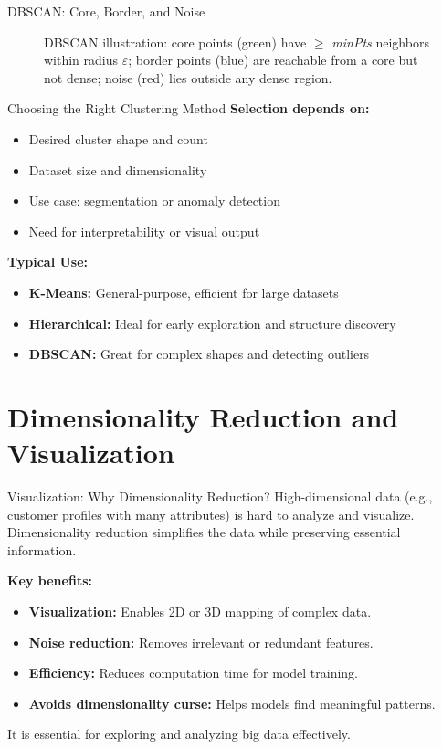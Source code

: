 \documentclass[aspectratio=169, table]{beamer}
\begin{document}
\begin{frame}{DBSCAN: Core, Border, and Noise}
\begin{figure}
		\caption{DBSCAN illustration: core points (green) have $\ge$ \textit{minPts} neighbors within radius $\varepsilon$; border points (blue) are reachable from a core but not dense; noise (red) lies outside any dense region.}
		\label{fig:dbscan-tikz}
	\end{figure}
\end{frame}


\begin{frame}{Choosing the Right Clustering Method}
	\textbf{Selection depends on:}
	\begin{itemize}
		\item Desired cluster shape and count
		\item Dataset size and dimensionality
		\item Use case: segmentation or anomaly detection
		\item Need for interpretability or visual output
	\end{itemize}
	
	\textbf{Typical Use:}
	\begin{itemize}
		\item \textbf{K-Means:} General-purpose, efficient for large datasets
		\item \textbf{Hierarchical:} Ideal for early exploration and structure discovery
		\item \textbf{DBSCAN:} Great for complex shapes and detecting outliers
	\end{itemize}
\end{frame}


\section{Dimensionality Reduction and Visualization}

\begin{frame}{Visualization: Why Dimensionality Reduction?}
	High-dimensional data (e.g., customer profiles with many attributes) is hard to analyze and visualize. Dimensionality reduction simplifies the data while preserving essential information.
	
	\textbf{Key benefits:}
	\begin{itemize}
		\item \textbf{Visualization:} Enables 2D or 3D mapping of complex data.
		\item \textbf{Noise reduction:} Removes irrelevant or redundant features.
		\item \textbf{Efficiency:} Reduces computation time for model training.
		\item \textbf{Avoids dimensionality curse:} Helps models find meaningful patterns.
	\end{itemize}
	
	It is essential for exploring and analyzing big data effectively.
\end{frame}
\end{document}
